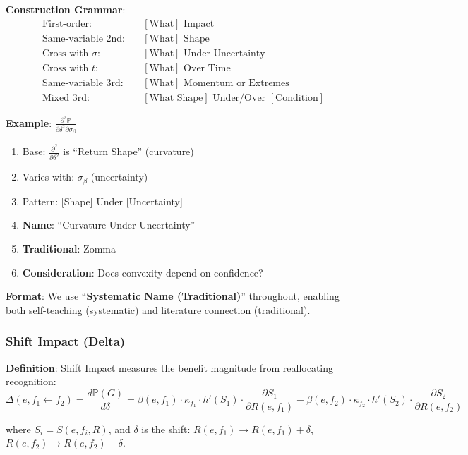 \textbf{Construction Grammar}:
\begin{align*}
\text{First-order:} \quad & [\text{What}] \text{ Impact} \\
\text{Same-variable 2nd:} \quad & [\text{What}] \text{ Shape} \\
\text{Cross with } \sigma\text{:} \quad & [\text{What}] \text{ Under Uncertainty} \\
\text{Cross with } t\text{:} \quad & [\text{What}] \text{ Over Time} \\
\text{Same-variable 3rd:} \quad & [\text{What}] \text{ Momentum or Extremes} \\
\text{Mixed 3rd:} \quad & [\text{What Shape}] \text{ Under/Over } [\text{Condition}]
\end{align*}

\textbf{Example}: $\frac{\partial^3 \mathbb{P}}{\partial \delta^2 \partial \sigma_\beta}$
\begin{enumerate}
\item Base: $\frac{\partial^2}{\partial \delta^2}$ is ``Return Shape'' (curvature)
\item Varies with: $\sigma_\beta$ (uncertainty)
\item Pattern: [Shape] Under [Uncertainty]
\item \textbf{Name}: ``Curvature Under Uncertainty''
\item \textbf{Traditional}: Zomma
\item \textbf{Consideration}: Does convexity depend on confidence?
\end{enumerate}

\textbf{Format}: We use ``\textbf{Systematic Name (Traditional)}'' throughout, enabling both self-teaching (systematic) and literature connection (traditional).

\subsubsection{Shift Impact (Delta)}

\textbf{Definition}: Shift Impact measures the benefit magnitude from reallocating recognition:
\[ \Delta(e, f_1 \leftarrow f_2) = \frac{d\mathbb{P}(G)}{d\delta} = \beta(e,f_1) \cdot \kappa_{f_1} \cdot h'(S_1) \cdot \frac{\partial S_1}{\partial R(e,f_1)} - \beta(e,f_2) \cdot \kappa_{f_2} \cdot h'(S_2) \cdot \frac{\partial S_2}{\partial R(e,f_2)} \]

where $S_i = S(e,f_i,R)$, and $\delta$ is the shift: $R(e,f_1) \to R(e,f_1) + \delta$, $R(e,f_2) \to R(e,f_2) - \delta$.

